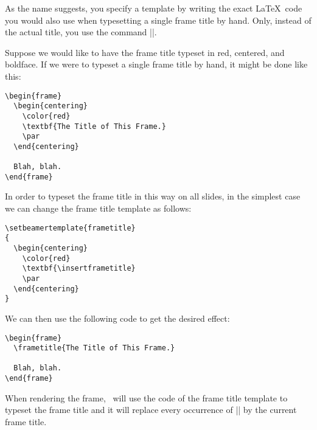 As the name suggests, you specify a template by writing the exact
\LaTeX\ code you would also use when typesetting a single frame title
by hand. Only, instead of the actual title, you use the command
|\insertframetitle|.

\example
Suppose we would like to have the frame title typeset in
red, centered, and boldface. If we were to typeset a single frame
title by hand, it might be done like this:
\begin{verbatim}
\begin{frame}
  \begin{centering}
    \color{red}
    \textbf{The Title of This Frame.}
    \par
  \end{centering}

  Blah, blah.
\end{frame}
\end{verbatim}

In order to typeset the frame title in this way on all slides, in the
simplest case we can change the frame title template as follows:
\begin{verbatim}
\setbeamertemplate{frametitle}
{
  \begin{centering}
    \color{red}
    \textbf{\insertframetitle}
    \par
  \end{centering}
}
\end{verbatim}

We can then use the following code to get the desired effect:
\begin{verbatim}
\begin{frame}
  \frametitle{The Title of This Frame.}

  Blah, blah.
\end{frame}
\end{verbatim}
When rendering the frame, \beamer\ will use the code of the
frame title template to typeset the frame title and it will replace
every occurrence of |\insertframetitle| by the current frame
title.

